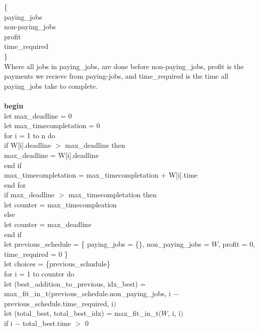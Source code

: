 \documentclass{article}
\begin{document}
        \{\\
          paying\_jobs\\
          non-paying\_jobs\\
          profit\\
          time\_required\\
        \}\\
        Where all jobs in paying\_jobs, are done before non-paying\_jobs, profit is the payments we recieve from paying-jobs, and time\_required is the time all paying\_jobs take to complete. \\
        \\
        \textbf{begin} \\
          let max\_deadline = 0\\
          let max\_timecompletation = 0\\
          for i = 1 to n do\\
          \indent if W[i].deadline $>$ max\_deadline then\\
          \indent \indent max\_deadline = W[i].deadline\\
          \indent end if\\
          \indent max\_timecompletation = max\_timecompletation + W[i].time\\
          end for\\
          if max\_deadline $>$ max\_timecompletation then\\
          \indent let counter = max\_timecompleation\\
          else \\
          \indent let counter = max\_deadline\\
          end if\\
          let previous\_schedule = \{ paying\_jobs = \{\}, non\_paying\_jobs = $W$, profit = 0, time\_required = 0 \}\\
          let choices = \{previous\_schudule\}\\
          for i = 1 to counter do\\
          \indent let (best\_addition\_to\_previous, idx\_best) =\\
          \indent \indent max\_fit\_in\_t$($previous\_schedule.non\_paying\_jobs, i $-$ previous\_schedule.time\_required, i$)$\\
          \indent let (total\_best, total\_best\_idx) = max\_fit\_in\_t$(W$, i, i$)$\\
          \indent if i $-$ total\_best.time $>$ 0\\
\end{document}
